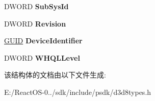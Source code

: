\begin{DoxyCompactItemize}
D\+W\+O\+RD {\bfseries Sub\+Sys\+Id}
\item 
\mbox{\label{struct___d3_d_a_d_a_p_t_e_r___i_d_e_n_t_i_f_i_e_r8_a7632de235a29d0abd2bb328580fe5747}} 
D\+W\+O\+RD {\bfseries Revision}
\item 
\mbox{\label{struct___d3_d_a_d_a_p_t_e_r___i_d_e_n_t_i_f_i_e_r8_abc037bbe7efc7e8774d0094381fa678c}} 
\hyperlink{interface_g_u_i_d}{G\+U\+ID} {\bfseries Device\+Identifier}
\item 
\mbox{\label{struct___d3_d_a_d_a_p_t_e_r___i_d_e_n_t_i_f_i_e_r8_a2d2f5efa52a3ec2a027cd03e1af7e2fd}} 
D\+W\+O\+RD {\bfseries W\+H\+Q\+L\+Level}
\end{DoxyCompactItemize}


该结构体的文档由以下文件生成\+:\begin{DoxyCompactItemize}
\item 
E\+:/\+React\+O\+S-\/0../sdk/include/psdk/d3d8types.\+h\end{DoxyCompactItemize}
